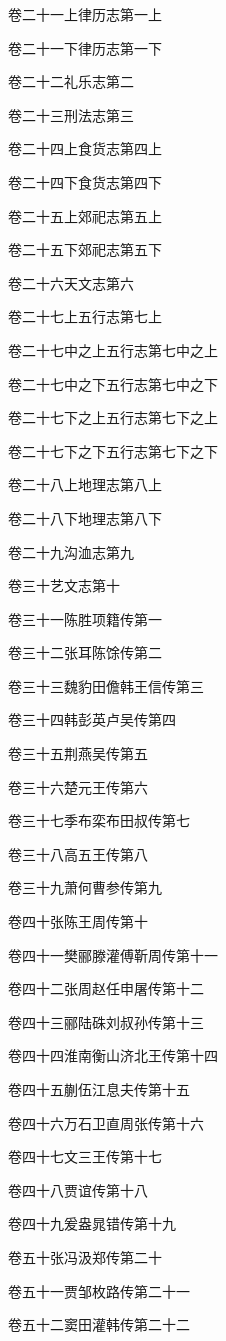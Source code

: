 \documentclass[12pt,UTF8]{ctexbook}
\begin{document}
卷二十一上律历志第一上

卷二十一下律历志第一下

卷二十二礼乐志第二

卷二十三刑法志第三

卷二十四上食货志第四上

卷二十四下食货志第四下

卷二十五上郊祀志第五上

卷二十五下郊祀志第五下

卷二十六天文志第六

卷二十七上五行志第七上

卷二十七中之上五行志第七中之上

卷二十七中之下五行志第七中之下

卷二十七下之上五行志第七下之上

卷二十七下之下五行志第七下之下

卷二十八上地理志第八上

卷二十八下地理志第八下

卷二十九沟洫志第九

卷三十艺文志第十

卷三十一陈胜项籍传第一

卷三十二张耳陈馀传第二

卷三十三魏豹田儋韩王信传第三

卷三十四韩彭英卢吴传第四

卷三十五荆燕吴传第五

卷三十六楚元王传第六

卷三十七季布栾布田叔传第七

卷三十八高五王传第八

卷三十九萧何曹参传第九

卷四十张陈王周传第十

卷四十一樊郦滕灌傅靳周传第十一

卷四十二张周赵任申屠传第十二

卷四十三郦陆硃刘叔孙传第十三

卷四十四淮南衡山济北王传第十四

卷四十五蒯伍江息夫传第十五

卷四十六万石卫直周张传第十六

卷四十七文三王传第十七

卷四十八贾谊传第十八

卷四十九爰盎晁错传第十九

卷五十张冯汲郑传第二十

卷五十一贾邹枚路传第二十一

卷五十二窦田灌韩传第二十二
\end{document}
